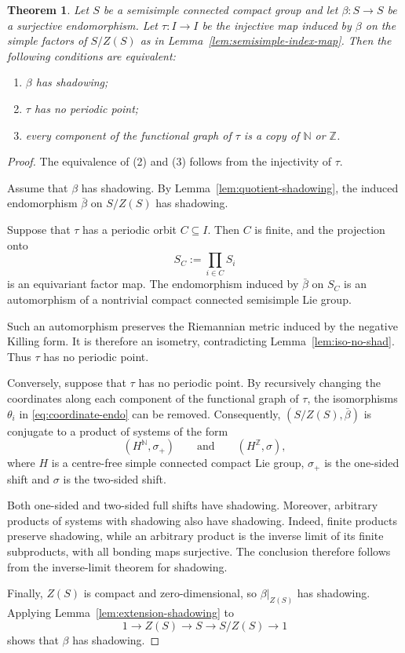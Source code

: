 \documentclass[12pt]{amsart}
\newtheorem{theorem}{Theorem}[section]
\theoremstyle{definition}
\numberwithin{equation}{section}
\theoremstyle{remark}
\begin{document}
\begin{theorem}\label{thm:semisimple-sur}
Let $S$ be a semisimple connected compact group and let
$\beta:S\to S$ be a surjective endomorphism. Let
$\tau:I\to I$ be the injective map induced by $\beta$ on the simple
factors of $S/Z(S)$ as in
Lemma~\ref{lem:semisimple-index-map}. Then the following conditions
are equivalent:
\begin{enumerate}
\item $\beta$ has shadowing;
\item $\tau$ has no periodic point;
\item every component of the functional graph of $\tau$ is a copy of
$\mathbb N$ or $\mathbb Z$.
\end{enumerate}
\end{theorem}

\begin{proof}
The equivalence of (2) and (3) follows from the injectivity of $\tau$.

Assume that $\beta$ has shadowing. By
Lemma~\ref{lem:quotient-shadowing}, the induced endomorphism
$\bar\beta$ on $S/Z(S)$ has shadowing.

Suppose that $\tau$ has a periodic orbit $C\subseteq I$. Then $C$ is
finite, and the projection onto
\[
S_C:=\prod_{i\in C}S_i
\]
is an equivariant factor map. The endomorphism induced by
$\bar\beta$ on $S_C$ is an automorphism of a nontrivial compact
connected semisimple Lie group.

Such an automorphism preserves the Riemannian metric induced by the
negative Killing form. It is therefore an isometry, contradicting
Lemma~\ref{lem:iso-no-shad}. Thus $\tau$ has no
periodic point.

Conversely, suppose that $\tau$ has no periodic point. By recursively
changing the coordinates along each component of the functional graph
of $\tau$, the isomorphisms $\theta_i$ in
\eqref{eq:coordinate-endo} can be removed. Consequently,
$(S/Z(S),\bar\beta)$ is conjugate to a product of systems of the form
\[
(H^{\mathbb N},\sigma_+)
\qquad\text{and}\qquad
(H^{\mathbb Z},\sigma),
\]
where $H$ is a centre-free simple connected compact Lie group,
$\sigma_+$ is the one-sided shift and $\sigma$ is the two-sided shift.

Both one-sided and two-sided full shifts have shadowing. Moreover, arbitrary products of systems with shadowing also have shadowing. 
Indeed, finite products preserve shadowing, while an arbitrary product is the inverse limit of its finite subproducts, with all bonding maps surjective. 
The conclusion therefore follows from the inverse-limit theorem for shadowing.


Finally, $Z(S)$ is compact and zero-dimensional, so
$\beta|_{Z(S)}$ has shadowing. Applying
Lemma~\ref{lem:extension-shadowing} to
\[
1\longrightarrow Z(S)\longrightarrow S
\longrightarrow S/Z(S)\longrightarrow 1
\]
shows that $\beta$ has shadowing.
\end{proof}
\end{document}
